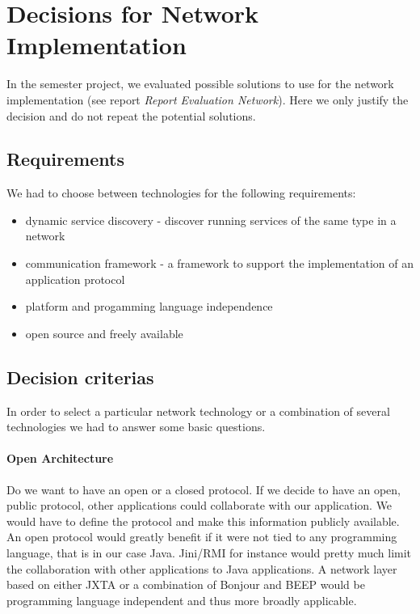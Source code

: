 \chapter{Decisions for Network Implementation}
\label{chapter:decisionsnetwork}

In the semester project, we evaluated possible solutions to use for the network implementation (see report \emph{Report Evaluation Network}). Here we only justify the decision and do not repeat the potential solutions.

\section{Requirements}
We had to choose between technologies for the following requirements:

\begin{itemize}
\item dynamic service discovery - discover running services of the same type in a network
\item communication framework - a framework to support the implementation of an application protocol
\item platform and progamming language independence
\item open source and freely available
\end{itemize}


\section{Decision criterias}
In order to select a particular network technology or a combination of several technologies we had to answer some basic questions. 

\subsubsection{Open Architecture} 
Do we want to have an open or a closed protocol. If we decide to have an open, public protocol, other applications could collaborate with our application. We would have to define the protocol and make this information publicly available. An open protocol would greatly benefit if it were not tied to any programming language, that is in our case Java. Jini/RMI for instance would pretty much limit the collaboration with other applications to Java applications. A network layer based on either JXTA or a combination of Bonjour and BEEP would be programming language independent and thus more broadly applicable. 


